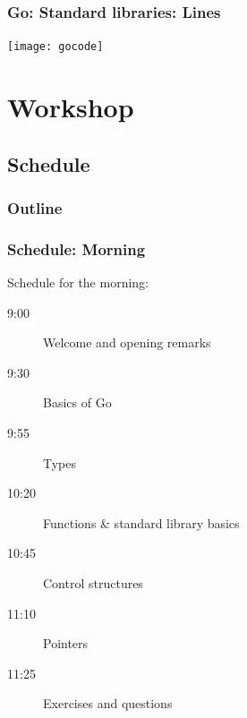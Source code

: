 \begin{frame}[t]
  \frametitle{Go: Standard libraries: Lines}

  \texttt{[image: gocode]}

\end{frame}

\section{Workshop}
\subsection{Schedule}

\begin{frame}[t]
  \frametitle{Outline}

  \tableofcontents[currentsection]
\end{frame}

\begin{frame}[t]
  \frametitle{Schedule: Morning}

  Schedule for the morning:

  \begin{description}
  \item[9:00] Welcome and opening remarks
  \item[9:30] Basics of Go
  \item[9:55] Types
  \item[10:20] Functions \& standard library basics
  \item[10:45] Control structures
  \item[11:10] Pointers
  \item[11:25] Exercises and questions
  \end{description}
\end{frame}

